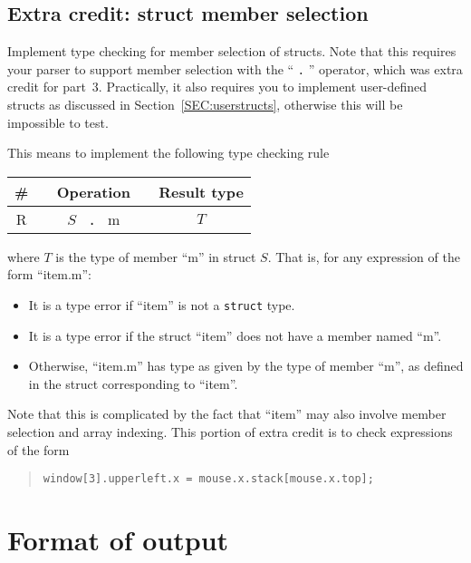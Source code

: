 \documentclass{article}
\newcounter{rule}
\newcommand{\rulenumber}[1]{\refstepcounter{rule}R\therule\label{RULE:#1}}
\newcommand{\parser}{3}
\begin{document}
\subsection{Extra credit: struct member selection}
\label{SEC:members}

Implement type checking for member selection of structs.
Note that this requires your parser to support member selection
with the `` {\tt .} '' operator,
which was extra credit for part~\parser.
Practically, it also requires you to implement user-defined structs
as discussed in Section~\ref{SEC:userstructs},
otherwise this will be impossible to test.

This means to implement the following type checking rule
\begin{center}
  \begin{tabular}{cc|c}
    \# & ~ \qquad Operation \qquad ~ & Result type
  \\ \hline
    \rulenumber{members}
    & $S$ ~\verb|.|~ m & $T$
  \end{tabular}
\end{center}
where $T$ is the type of member ``m'' in struct $S$.
That is,
  for any expression of the form ``item.m'':
\begin{itemize}
  \item
  It is a type error if ``item'' is not a {\tt struct} type.

  \item
  It is a type error if the struct ``item''
  does not have a member named ``m''.

  \item
  Otherwise, ``item.m''
  has type as given by the type of member ``m'',
  as defined in the struct corresponding to ``item''.
\end{itemize}
Note that this is complicated by the fact that ``item''
may also involve member selection and array indexing.
This portion of extra credit is to check expressions of the form
\begin{quote}
\begin{lstlisting}[numbers=none]
  window[3].upperleft.x = mouse.x.stack[mouse.x.top];
\end{lstlisting}
\end{quote}


\section{Format of output} \label{SEC:output}
\end{document}
